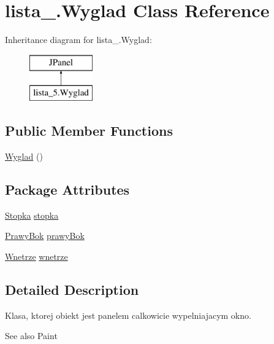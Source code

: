 \hypertarget{classlista__5_1_1_wyglad}{}\section{lista\+\_.\+Wyglad Class Reference}
\label{classlista__5_1_1_wyglad}
Inheritance diagram for lista\+\_.\+Wyglad\+:\begin{figure}[H]
\begin{center}
\leavevmode
\includegraphics[height=2.000000cm]{classlista__5_1_1_wyglad}
\end{center}
\end{figure}
\subsection*{Public Member Functions}
\begin{DoxyCompactItemize}
\item 
\mbox{\hyperlink{classlista__5_1_1_wyglad_aa8dcaceecff0bce220abc4e796ff44d5}{Wyglad}} ()
\end{DoxyCompactItemize}
\subsection*{Package Attributes}
\begin{DoxyCompactItemize}
\item 
\mbox{\hyperlink{classlista__5_1_1_stopka}{Stopka}} \mbox{\hyperlink{classlista__5_1_1_wyglad_a73653db64a554970f69f0074013c2efd}{stopka}}
\item 
\mbox{\hyperlink{classlista__5_1_1_prawy_bok}{Prawy\+Bok}} \mbox{\hyperlink{classlista__5_1_1_wyglad_aa59e5268c008769e2b033eea9441caff}{prawy\+Bok}}
\item 
\mbox{\hyperlink{classlista__5_1_1_wnetrze}{Wnetrze}} \mbox{\hyperlink{classlista__5_1_1_wyglad_a76f7663502062e7784d87c1cc855721b}{wnetrze}}
\end{DoxyCompactItemize}


\subsection{Detailed Description}
Klasa, ktorej obiekt jest panelem calkowicie wypelniajacym okno. \begin{DoxySeeAlso}{See also}
Paint 
\end{DoxySeeAlso}


